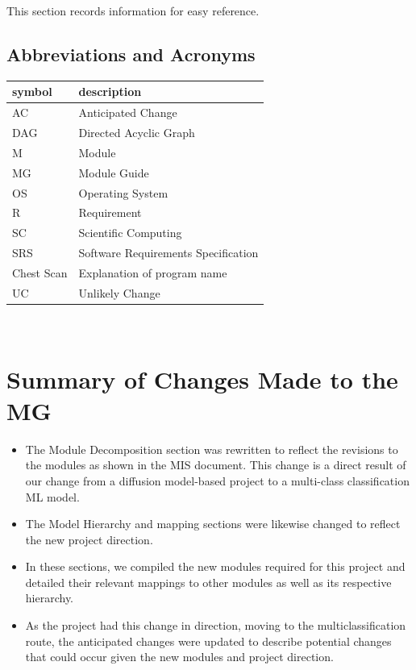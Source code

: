 \documentclass[12pt, titlepage]{article}
\begin{document}
This section records information for easy reference.

\subsection{Abbreviations and Acronyms}

\renewcommand{\arraystretch}{1.2}
\begin{tabular}{l l} 
  \toprule		
  \textbf{symbol} & \textbf{description}\\
  \midrule 
  AC & Anticipated Change\\
  DAG & Directed Acyclic Graph \\
  M & Module \\
  MG & Module Guide \\
  OS & Operating System \\
  R & Requirement\\
  SC & Scientific Computing \\
  SRS & Software Requirements Specification\\
  Chest Scan & Explanation of program name\\
  UC & Unlikely Change \\
  \bottomrule
\end{tabular}\\

\newpage

\tableofcontents

\newpage


\section{Summary of Changes Made to the MG}

\begin{itemize}
    \item The Module Decomposition section was rewritten to reflect the revisions to the modules as shown in the MIS document. This change is a direct result of our change from a diffusion model-based project to a multi-class classification ML model.
    \item The Model Hierarchy and mapping sections were likewise changed to reflect the new project direction.
    \item In these sections, we compiled the new modules required for this project and detailed their relevant mappings to other modules as well as its respective hierarchy.
    \item As the project had this change in direction, moving to the multiclassification route, the anticipated changes were updated to describe potential changes that could occur given the new modules and project direction.
\end{itemize}
\end{document}
